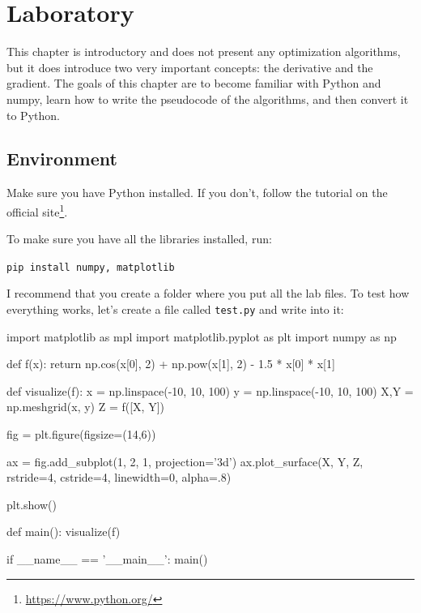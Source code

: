 \section{Laboratory}
\label{sec:op.laboratory}

This chapter is introductory and does not present any optimization algorithms, but it does introduce two very important concepts: the derivative and the gradient. The goals of this chapter are to become familiar with Python and numpy, learn how to write the pseudocode of the algorithms, and then convert it to Python.

\subsection{Environment}

Make sure you have Python installed. If you don't, follow the tutorial on the official site\footnote{\url{https://www.python.org/}}.

To make sure you have all the libraries installed, run:
\begin{adjustwidth}{1cm}{}
    \texttt{pip install numpy, matplotlib}
\end{adjustwidth}

I recommend that you create a folder where you put all the lab files. To test how everything works, let's create a file called \texttt{test.py} and write into it:

\begin{python}
import matplotlib as mpl
import matplotlib.pyplot as plt
import numpy as np

def f(x):
    return np.cos(x[0], 2) + np.pow(x[1], 2) - 1.5 * x[0] * x[1]

def visualize(f):
    x = np.linspace(-10, 10, 100)
    y = np.linspace(-10, 10, 100)
    X,Y = np.meshgrid(x, y)
    Z = f([X, Y])

    fig = plt.figure(figsize=(14,6))

    ax = fig.add_subplot(1, 2, 1, projection='3d')
    ax.plot_surface(X, Y, Z, rstride=4, cstride=4, linewidth=0, alpha=.8)

    plt.show()

def main():
    visualize(f)

if __name__ == '__main__':
    main()
\end{python}

